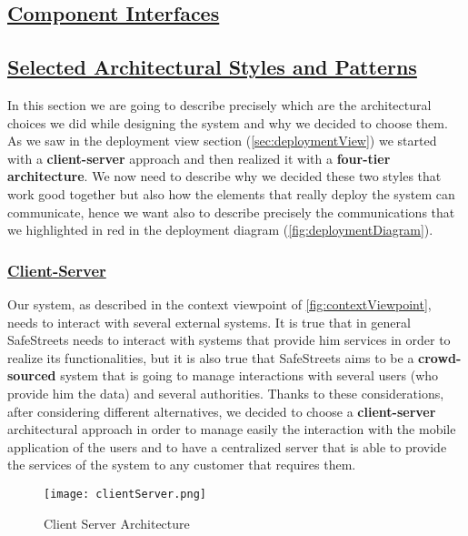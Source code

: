 	\subsection[Component Interfaces]{\hyperlink{toc}{Component Interfaces}}
		\label{sec:componentInterfaces}
		
	\subsection[Selected Architectural Styles and Patterns]{\hyperlink{toc}{Selected Architectural Styles and Patterns}}
		\label{sec:selectedArchitecturalStylesAndPatterns}
		
		In this section we are going to describe precisely which are the architectural choices we did while designing the system and why we decided to choose them. As we saw in the deployment view section (\ref{sec:deploymentView}) we started with a \textbf{client-server} approach and then realized it with a \textbf{four-tier architecture}. We now need to describe why we decided these two styles that work good together but also how the elements that really deploy the system can communicate, hence we want also to describe precisely the communications that we highlighted in red in the deployment diagram (\autoref{fig:deploymentDiagram}).
		
		\subsubsection[Client-Server]{\hyperlink{toc}{Client-Server}}
			\label{sec:clientServerDecision}
			
			Our system, as described in the context viewpoint of \autoref{fig:contextViewpoint}, needs to interact with several external systems. It is true that in general SafeStreets needs to interact with systems that provide him services in order to realize its functionalities, but it is also true that SafeStreets aims to be a \textbf{crowd-sourced} system that is going to manage interactions with several users (who provide him the data) and several authorities. Thanks to these considerations, after considering different alternatives, we decided to choose a \textbf{client-server} architectural approach in order to manage easily the interaction with the mobile application of the users and to have a centralized server that is able to provide the services of the system to any customer that requires them.
			
			\begin{figure}[h!]
				\centering
				\texttt{[image: clientServer.png]}
				\caption{\label{fig:clientServerArchitecture} Client Server Architecture}
			\end{figure}


